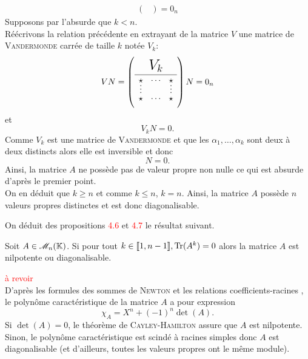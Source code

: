 \begin{preuve}
\begin{itemize}
\begin{align*}
\begin{pmatrix}
            \end{pmatrix}
            =
            0_n
        \end{align*}
        Supposons par l'absurde que $k < n$. \\
        Réécrivons la relation précédente en extrayant de la matrice $V$ une matrice de \textsc{Vandermonde} carrée de taille $k$ notée $V_k$:
        $$V N = \vandermondepartiel N = 0_n$$
        et
        $$V_k N = 0.$$
        Comme $V_k$ est une matrice de \textsc{Vandermonde} et que les $\alpha_1, \dots, \alpha_k$ sont deux à deux distincts alors elle est inversible et donc
        $$N = 0.$$
        Ainsi, la matrice $A$ ne possède pas de valeur propre non nulle ce qui est absurde d'après le premier point. \\
        On en déduit que $k \geqslant n$ et comme $k \leqslant n$, $k=n$. Ainsi, la matrice $A$ possède $n$ valeurs propres distinctes et est donc diagonalisable.
    \end{itemize}
\end{preuve}

On déduit des propositions \textcolor{red}{4.6} et \textcolor{red}{4.7} le résultat suivant.
\begin{prop}
    Soit $A \in \mathscr{M}_n(\mathbb{K})$. Si pour tout $k \in \llbracket 1, n-1 \rrbracket, \mathrm{Tr}(A^k) = 0$ alors la matrice $A$ est nilpotente ou diagonalisable.
\end{prop}


\begin{preuve}
    \textcolor{red}{à revoir} \\
    D'après les formules des sommes de \textsc{Newton} et les relations coefficients-racines \note, le polynôme caractéristique de la matrice $A$ a pour expression
    $$\chi_A = X^n + (-1)^n \det(A).$$
    Si $\det(A) = 0$, le théorème de \textsc{Cayley}-\textsc{Hamilton} assure que $A$ est nilpotente. Sinon, le polynôme caractéristique est scindé à racines simples donc $A$ est diagonalisable (et d'ailleurs, toutes les valeurs propres ont le même module).
\end{preuve}
